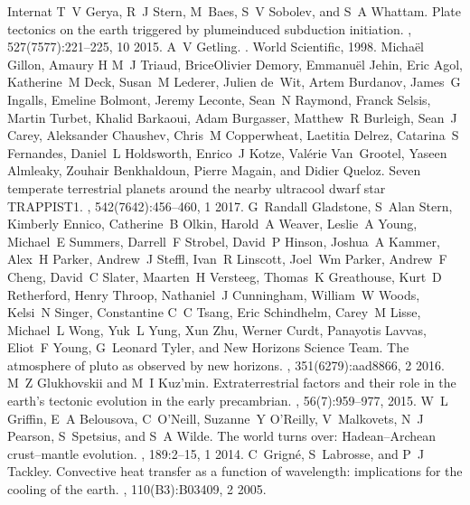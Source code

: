 \documentclass[letterpaper,10pt,english]{jupyterBook}
\begin{document}
\begin{sphinxthebibliography}{Internat}
\sphinxAtStartPar
T V Gerya, R J Stern, M Baes, S V Sobolev, and S A Whattam. Plate tectonics on the earth triggered by plume\sphinxhyphen{}induced subduction initiation. , 527(7577):221–225, 10 2015.
\sphinxAtStartPar
A V Getling. . World Scientific, 1998.
\sphinxAtStartPar
Michaël Gillon, Amaury H M J Triaud, Brice\sphinxhyphen{}Olivier Demory, Emmanuël Jehin, Eric Agol, Katherine M Deck, Susan M Lederer, Julien de Wit, Artem Burdanov, James G Ingalls, Emeline Bolmont, Jeremy Leconte, Sean N Raymond, Franck Selsis, Martin Turbet, Khalid Barkaoui, Adam Burgasser, Matthew R Burleigh, Sean J Carey, Aleksander Chaushev, Chris M Copperwheat, Laetitia Delrez, Catarina S Fernandes, Daniel L Holdsworth, Enrico J Kotze, Valérie Van Grootel, Yaseen Almleaky, Zouhair Benkhaldoun, Pierre Magain, and Didier Queloz. Seven temperate terrestrial planets around the nearby ultracool dwarf star TRAPPIST\sphinxhyphen{}1. , 542(7642):456–460, 1 2017.
\sphinxAtStartPar
G Randall Gladstone, S Alan Stern, Kimberly Ennico, Catherine B Olkin, Harold A Weaver, Leslie A Young, Michael E Summers, Darrell F Strobel, David P Hinson, Joshua A Kammer, Alex H Parker, Andrew J Steffl, Ivan R Linscott, Joel Wm Parker, Andrew F Cheng, David C Slater, Maarten H Versteeg, Thomas K Greathouse, Kurt D Retherford, Henry Throop, Nathaniel J Cunningham, William W Woods, Kelsi N Singer, Constantine C C Tsang, Eric Schindhelm, Carey M Lisse, Michael L Wong, Yuk L Yung, Xun Zhu, Werner Curdt, Panayotis Lavvas, Eliot F Young, G Leonard Tyler, and New Horizons Science Team. The atmosphere of pluto as observed by new horizons. , 351(6279):aad8866, 2 2016.
\sphinxAtStartPar
M Z Glukhovskii and M I Kuz'min. Extraterrestrial factors and their role in the earth's tectonic evolution in the early precambrian. , 56(7):959–977, 2015.
\sphinxAtStartPar
W L Griffin, E A Belousova, C O'Neill, Suzanne Y O'Reilly, V Malkovets, N J Pearson, S Spetsius, and S A Wilde. The world turns over: Hadean–Archean crust–mantle evolution. , 189:2–15, 1 2014.
\sphinxAtStartPar
C Grigné, S Labrosse, and P J Tackley. Convective heat transfer as a function of wavelength: implications for the cooling of the earth. , 110(B3):B03409, 2 2005.

\end{sphinxthebibliography}
\end{document}
